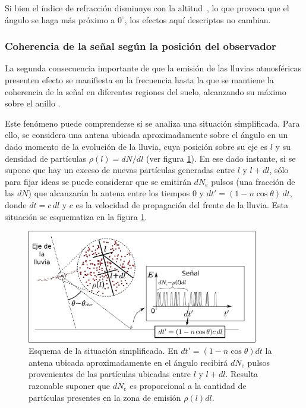 	Si bien el \'indice de refracci\'on disminuye con la altitud~\cite{zhairezAir}, lo que provoca que el \'angulo \cher{} se haga m\'as pr\'oximo a $0^\circ$, los efectos aqu\'i descriptos no cambian.  
	
	\subsubsection{Coherencia de la se\~nal seg\'un la posici\'on del observador}
	
	La segunda consecuencia importante de que la emisi\'on de las lluvias atmosf\'ericas presenten efecto \cher{} se manifiesta en la frecuencia hasta la que se mantiene la coherencia de la se\~nal en diferentes regiones del suelo, alcanzando su m\'aximo sobre el anillo \cher{}.
	
	Este fen\'omeno puede comprenderse si se analiza una situaci\'on simplificada.
	Para ello, se considera una antena ubicada aproximadamente sobre el \'angulo \cher{} en un dado momento de la evoluci\'on de la lluvia, cuya posici\'on sobre su eje es $l$ y su densidad de part\'iculas $\rho(l)=dN/dl$ (ver figura \ref{fig:coherencia_1}).
	En ese dado instante, si se supone que hay un exceso de nuevas part\'iculas generadas entre $l$ y $l+dl$, s\'olo para fijar ideas se puede considerar que se emitir\'an $dN_e$ pulsos  (una fracci\'on de las $dN$) que alcanzar\'an la antena entre los tiempos $0$ y $dt'=(1-n\cos\theta)\,dt$, donde $dt=c\,dl$ y $c$ es la velocidad de propagaci\'on del frente de la lluvia.
	Esta situaci\'on se esquematiza en la figura \ref{fig:coherencia_1}.
	\begin{figure}[ht!]
		\centering
		\includegraphics[width=0.9\textwidth]{fig/EASRadio/coherencia_2}
		\caption{\label{fig:coherencia_1} Esquema de la situaci\'on simplificada. En $dt'=(1-n\cos\theta)dt$ la antena ubicada aproximadamente en el \'angulo \cher{} recibir\'a $dN_e$ pulsos provenientes de las part\'iculas ubicadas entre $l$ y $l+dl$. Resulta razonable suponer que $dN_e$ es proporcional a la cantidad de part\'iculas presentes en la zona de emisi\'on $\rho(l)dl$.}
	\end{figure}
	
